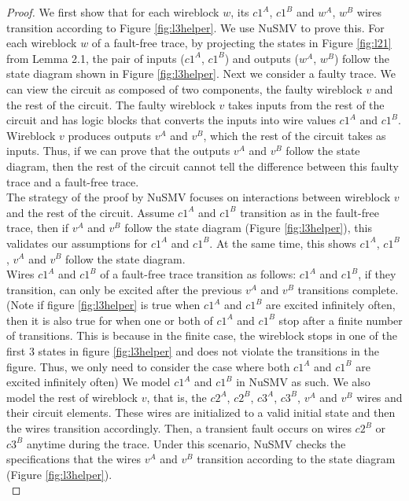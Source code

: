 \documentclass[12pt]{report}
\begin{document}
\begin{proof}
We first show that for each wireblock $w$, its $c1^A$, $c1^B$ and $w^A$, $w^B$ wires transition according to Figure \ref{fig:l3helper}.  
We use NuSMV to prove this. For each wireblock $w$ of a fault-free trace, by projecting the states in Figure \ref{fig:l21} from Lemma 2.1, the pair of inputs ($c1^A$, $c1^B$) and outputs ($w^A$, $w^B$) follow the state diagram shown in Figure \ref{fig:l3helper}.  Next we consider a faulty trace.  We can view the circuit as composed of two components, the faulty wireblock $v$ and the rest of the circuit. The faulty wireblock $v$ takes inputs from the rest of the circuit and has logic blocks that converts the inputs into wire values $c1^A$ and $c1^B$. Wireblock $v$ produces outputs $v^A$ and $v^B$, which the rest of the circuit takes as inputs.  Thus, if we can prove that the outputs $v^A$ and $v^B$ follow the state diagram, then the rest of the circuit cannot tell the difference between this faulty trace and a fault-free trace. \\

The strategy of the proof by NuSMV focuses on interactions between wireblock $v$ and the rest of the circuit.  Assume $c1^A$ and $c1^B$ transition as in the fault-free trace, then if $v^A$ and $v^B$ follow the state diagram (Figure \ref{fig:l3helper}), this validates our assumptions for $c1^A$ and $c1^B$.  At the same time, this shows $c1^A$, $c1^B$, $v^A$ and $v^B$ follow the state diagram. \\

Wires $c1^A$ and $c1^B$ of a fault-free trace transition as follows: $c1^A$ and $c1^B$, if they transition, can only be excited after the previous $v^A$ and $v^B$ transitions complete.  (Note if figure \ref{fig:l3helper} is true when $c1^A$ and $c1^B$ are excited infinitely often, then it is also true for when one or both of $c1^A$ and $c1^B$ stop after a finite number of transitions.  This is because in the finite case, the wireblock stops in one of the first 3 states in figure \ref{fig:l3helper} and does not violate the transitions in the figure.  Thus, we only need to consider the case where both $c1^A$ and $c1^B$ are excited infinitely often)  
We model $c1^A$ and $c1^B$ in NuSMV as such.  
We also model the rest of wireblock $v$, that is, the $c2^A$, $c2^B$, $c3^A$, $c3^B$, $v^A$ and $v^B$ wires and their circuit elements.  These wires are initialized to a valid initial state and then the wires transition accordingly.  Then, a transient fault occurs on wires $c2^B$ or $c3^B$ anytime during the trace. Under this scenario, NuSMV checks the specifications that the wires $v^A$ and $v^B$ transition according to the state diagram (Figure \ref{fig:l3helper}). \\


\end{proof}
\end{document}
